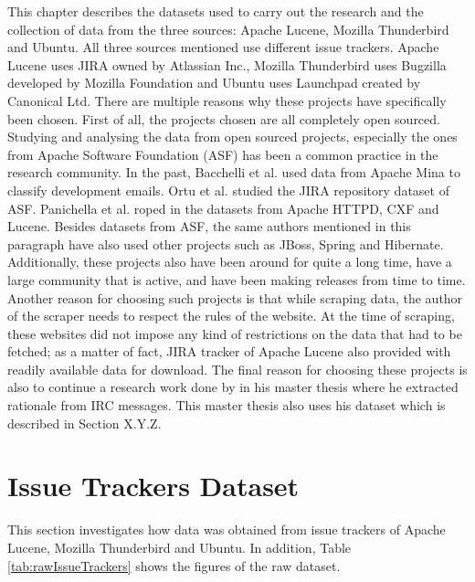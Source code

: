 \documentclass[a4paper,12pt,twoside]{report}
\begin{document}
This chapter describes the datasets used to carry out the research and the collection of data from the three sources: Apache Lucene, Mozilla Thunderbird and Ubuntu. All three sources mentioned use different issue trackers. Apache Lucene uses JIRA owned by Atlassian Inc., Mozilla Thunderbird uses Bugzilla developed by Mozilla Foundation and Ubuntu uses Launchpad created by Canonical Ltd. 
\bigbreak
There are multiple reasons why these projects have specifically been chosen. First of all, the projects chosen are all completely open sourced. Studying and analysing the data from open sourced projects, especially the ones from Apache Software Foundation (ASF) has been a common practice in the research community. In the past, Bacchelli et al.\cite{Bacchelli2012} used data from Apache Mina to classify development emails. Ortu et al.\cite{Ortu2015} studied the JIRA repository dataset of ASF. Panichella et al. \cite{Panichella2014} roped in the datasets from Apache HTTPD, CXF and Lucene. Besides datasets from ASF, the same authors mentioned in this paragraph have also used other projects such as JBoss, Spring and Hibernate. Additionally, these projects also have been around for quite a long time, have a large community that is active, and have been making releases from time to time. Another reason for choosing such projects is that while scraping data, the author of the scraper needs to respect the rules of the website. At the time of scraping, these websites did not impose any kind of restrictions on the data that had to be fetched; as a matter of fact, JIRA tracker of Apache Lucene also provided with readily available data for download. The final reason for choosing these projects is also to continue a research work done by \cite{Nonnenmacher2017} in his master thesis where he extracted rationale from IRC messages. This master thesis also uses his dataset which is described in Section X.Y.Z. 

\section{Issue Trackers Dataset}
This section investigates how data was obtained from issue trackers of Apache Lucene, Mozilla Thunderbird and Ubuntu. In addition, Table \ref{tab:rawIssueTrackers} shows the figures of the raw dataset. 
\end{document}
